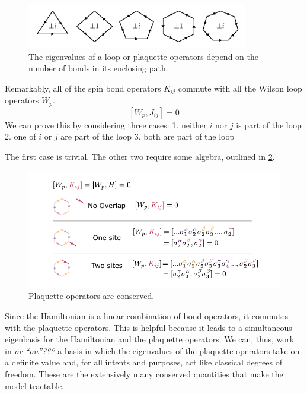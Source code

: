 \begin{figure}
\hypertarget{fig:regular_plaquettes}{%
\centering
\includegraphics[width=0.86\textwidth,height=\textheight]{figure_code/amk_chapter/intro/regular_plaquettes/regular_plaquettes.pdf}
\caption{The eigenvalues of a loop or plaquette operators depend on the number of bonds in its enclosing path.}\label{fig:regular_plaquettes}
}
\end{figure}

Remarkably, all of the spin bond operators \(K_{ij}\) commute with all the Wilson loop operators \(W_p\). \[[W_p, J_{ij}] = 0\] We can prove this by considering three cases: 1. neither \(i\) nor \(j\) is part of the loop 2. one of \(i\) or \(j\) are part of the loop 3. both are part of the loop

The first case is trivial. The other two require some algebra, outlined in \cref{fig:visual_kitaev_2}.

\begin{figure}
\hypertarget{fig:visual_kitaev_2}{%
\centering
\includegraphics[width=1\textwidth,height=\textheight]{figure_code/amk_chapter/visual_kitaev_2.pdf}
\caption{Plaquette operators are conserved.}\label{fig:visual_kitaev_2}
}
\end{figure}

Since the Hamiltonian is a linear combination of bond operators, it commutes with the plaquette operators. This is helpful because it leads to a simultaneous eigenbasis for the Hamiltonian and the plaquette operators. We can, thus, work in \emph{or ``on''???} a basis in which the eigenvalues of the plaquette operators take on a definite value and, for all intents and purposes, act like classical degrees of freedom. These are the extensively many conserved quantities that make the model tractable.

